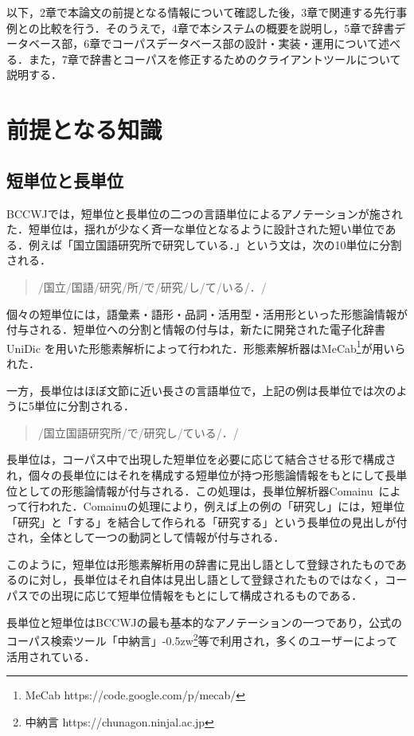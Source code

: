 \documentclass[japanese]{jnlp_1.4}
\begin{document}
以下，2章で本論文の前提となる情報について確認した後，3章で関連する先行事例との比較を行う．そのうえで，4章で本システムの概要を説明し，5章で辞書データベース部，6章でコーパスデータベース部の設計・実装・運用について述べる．また，7章で辞書とコーパスを修正するためのクライアントツールについて説明する．


\section{前提となる知識}
\label{sec:knowledge}


\subsection{短単位と長単位}
\label{sec:knowledge_unit}

BCCWJでは，短単位と長単位の二つの言語単位によるアノテーションが施された．短単位は，揺れが少なく斉一な単位となるように設計された短い単位である\cite{小椋ほか2011}．例えば「国立国語研究所で研究している．」という文は，次の10単位に分割される．
\begin{quote}
/国立/国語/研究/所/で/研究/し/て/いる/．/
\end{quote}
個々の短単位には，語彙素・語形・品詞・活用型・活用形といった形態論情報が付与される．短単位への分割と情報の付与は，新たに開発された電子化辞書UniDic \cite{伝ほか2007}を用いた形態素解析によって行われた．形態素解析器はMeCab\footnote{MeCab https://code.google.com/p/mecab/}が用いられた．

一方，長単位はほぼ文節に近い長さの言語単位で，上記の例は長単位では次のように5単位に分割される．
\begin{quote}
/国立国語研究所/で/研究し/ている/．/
\end{quote}
長単位は，コーパス中で出現した短単位を必要に応じて結合させる形で構成され，個々の長単位にはそれを構成する短単位が持つ形態論情報をもとにして長単位としての形態論情報が付与される．この処理は，長単位解析器Comainu~\cite{小澤ほか2011}によって行われた．Comainuの処理により，例えば上の例の「研究し」には，短単位「研究」と「する」を結合して作られる「研究する」という長単位の見出しが付され，全体として一つの動詞として情報が付与される．

このように，短単位は形態素解析用の辞書に見出し語として登録されたものであるのに対し，長単位はそれ自体は見出し語として登録されたものではなく，コーパスでの出現に応じて短単位情報をもとにして構成されるものである．

長単位と短単位はBCCWJの最も基本的なアノテーションの一つであり，公式のコーパス検索ツール「中納言」{\kern-0.5zw}\footnote{中納言 https://chunagon.ninjal.ac.jp}等で利用され，多くのユーザーによって活用されている．
\end{document}
